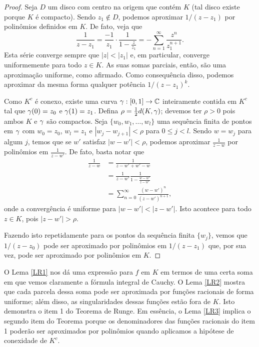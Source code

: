     \begin{proof}
        Seja $D$ um disco com centro na origem que contém $K$ (tal disco existe porque 
        $K$ é compacto). Sendo $z_1 \not \in D$, podemos aproximar $1/(z-z_1)$ por polinômios
        definidos em $K$. De fato, veja que
        \begin{equation*}
        \frac{1}{z-z_1}
        =
        \frac{-1}{z_1}\cdot\frac{1}{1-\frac{z}{z_1}} = - \sum_{n=1}^{\infty}\frac{z^n}{z_1^{n+1}}.
        \end{equation*}
        Esta série converge sempre que $|z| < |z_1|$ e, em particular, converge uniformemente 
        para todo $z \in K$. As suas somas parciais, então, são uma aproximação uniforme, 
        como afirmado. Como consequência disso, podemos aproximar da mesma forma qualquer 
        potência $1/(z-z_1)^k$.
        
        Como $K^c$ é conexo, existe uma curva $\gamma : [0,1] \to \mathbb{C}$ inteiramente contida em 
        $K^c$ tal que $\gamma(0) = z_0$ e $\gamma(1) =  z_1$. Defina $\rho = \frac{1}{2}d(K,\gamma)$;
        devemos ter $\rho > 0$ pois ambos $K$ e $\gamma$ são compactos. 
        Seja $\{w_0, w_1, \dots, w_l\}$ uma sequência finita de pontos em $\gamma$ com $w_0 = z_0$,
        $w_l = z_1$ e $|w_j - w_{j+1}| < \rho$ para $0 \leq j < l$. Sendo $w = w_j$ para algum $j$,
        temos que se $w'$ satisfaz $|w - w'| < \rho$, podemos aproximar $\frac{1}{z-w}$ 
        por polinômios em $\frac{1}{z-w'}$. De fato, basta notar que
        \begin{align*}
            \frac{1}{z-w} &= \frac{1}{z - w' + w' - w}\\
                          &= \frac{1}{z-w'}\frac{1}{1 - \frac{w - w'}{z - w'}}\\
                          &= \sum_{n = 0}^{\infty}\frac{(w-w')^n}{(z-w')^{n+1}},
        \end{align*}
        onde a convergência é uniforme para $|w-w'| < |z-w'|$. Isto acontece para todo 
        $z \in K$, pois $|z-w'|> \rho$.
        
        Fazendo isto repetidamente para os pontos da sequência finita $\{w_j\}$, vemos que 
        $1/(z-z_0)$ pode ser aproximado por polinômios em $1/(z-z_1)$ que, por sua vez, pode 
        ser aproximado por polinômios em $K$.
    \end{proof}
    
    O Lema \ref{LR1} nos dá uma expressão para $f$ em $K$ em termos de uma certa soma em 
    que vemos claramente a fórmula integral de Cauchy. O Lema \ref{LR2} mostra que cada parcela 
    dessa soma pode ser aproximada por funções racionais de forma uniforme; além disso, as
    singularidades dessas funções estão fora de $K$. Isto demonstra o item 1 do Teorema de Runge. 
    Em essência, o Lema \ref{LR3} implica o segundo item do Teorema porque os denominadores das
    funções racionais do item 1 poderão ser aproximados por polinômios quando aplicamos a hipótese
    de conexidade de $K^c$.
    
